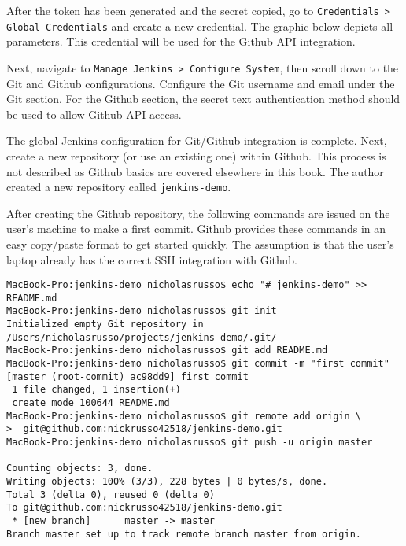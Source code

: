 
After the token has been generated and the secret copied,
go to \verb|Credentials > Global Credentials| and create a new
credential. The graphic below depicts all parameters. This credential will be
used for the Github API integration.


Next, navigate to \verb|Manage Jenkins > Configure System|, then scroll down
to the Git and Github configurations. Configure the Git username and email
under the Git section. For the Github section, the secret text authentication
method should be used to allow Github API access.



The global Jenkins configuration for Git/Github integration is complete. Next,
create a new repository (or use an existing one) within Github. This process
is not described as Github basics are covered elsewhere in this book. The
author created a new repository called \verb|jenkins-demo|.

After creating the Github repository, the following commands are issued on the
user's machine to make a first commit. Github provides these commands in an
easy copy/paste format to get started quickly. The assumption is that the
user's laptop already has the correct SSH integration with Github.

\begin{verbatim}
MacBook-Pro:jenkins-demo nicholasrusso$ echo "# jenkins-demo" >> README.md
MacBook-Pro:jenkins-demo nicholasrusso$ git init
Initialized empty Git repository in /Users/nicholasrusso/projects/jenkins-demo/.git/
MacBook-Pro:jenkins-demo nicholasrusso$ git add README.md
MacBook-Pro:jenkins-demo nicholasrusso$ git commit -m "first commit"
[master (root-commit) ac98dd9] first commit
 1 file changed, 1 insertion(+)
 create mode 100644 README.md
MacBook-Pro:jenkins-demo nicholasrusso$ git remote add origin \
>  git@github.com:nickrusso42518/jenkins-demo.git
MacBook-Pro:jenkins-demo nicholasrusso$ git push -u origin master

Counting objects: 3, done.
Writing objects: 100% (3/3), 228 bytes | 0 bytes/s, done.
Total 3 (delta 0), reused 0 (delta 0)
To git@github.com:nickrusso42518/jenkins-demo.git
 * [new branch]      master -> master
Branch master set up to track remote branch master from origin.
\end{verbatim}

